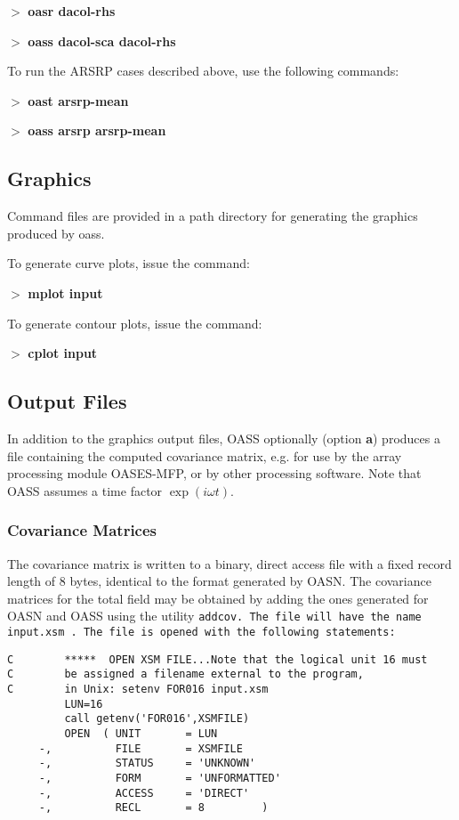  $>$ {\bf oasr dacol-rhs}

 $>$ {\bf oass dacol-sca dacol-rhs}

To run the ARSRP cases described above, use the following commands:
    
    $>$ {\bf oast arsrp-mean}

    $>$ {\bf oass arsrp arsrp-mean}

\subsection{Graphics}  

    Command files are provided in a path directory for generating 
the graphics produced by oass.

\noindent    To generate curve plots, issue the command:

    $>$ {\bf mplot input}

\noindent    To generate contour plots, issue the command:

    $>$ {\bf cplot input}


\subsection{Output Files}

In addition to the graphics output files, OASS optionally (option {\bf
a}) produces
a file containing the computed covariance matrix, e.g.
for use by the array processing module OASES-MFP, or by other
processing software. Note that OASS assumes a time factor $ \exp(i
\omega t) $. 


\subsubsection{Covariance Matrices}
\label{sec:scova}

The covariance matrix is written to a binary, direct access file with
a fixed record length of 8 bytes, identical to the format generated by
OASN. The covariance matrices for the total field may be obtained by
adding the ones generated for OASN and OASS using the utility 
\tt addcov. \rm The file will have the name \tt input.xsm \rm. The file is
opened with the following statements:

\small
\begin{verbatim}
C        *****  OPEN XSM FILE...Note that the logical unit 16 must 
C        be assigned a filename external to the program, 
C        in Unix: setenv FOR016 input.xsm
         LUN=16
         call getenv('FOR016',XSMFILE)
         OPEN  ( UNIT       = LUN
     -,          FILE       = XSMFILE
     -,          STATUS     = 'UNKNOWN'
     -,          FORM       = 'UNFORMATTED'
     -,          ACCESS     = 'DIRECT'
     -,          RECL       = 8         )
\end{verbatim}
\normalsize


